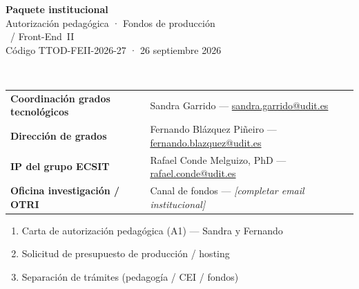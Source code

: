 \documentclass[11pt,a4paper]{scrartcl}
\begin{document}
\LogoRow
\begin{center}
  {\LARGE\sffamily\bfseries Paquete institucional}\\[0.35em]
  {\large\sffamily Autorización pedagógica · Fondos de producción}\\[0.5em]
  {\normalsize\color{uditnavy} \TTODfull\ / Front-End~II}\\[0.35em]
  {\small Código TTOD-FEII-2026-27 · 26 septiembre 2026}
\end{center}

\vspace{0.5em}
\\[0.25em]
\noindent
\begin{tabularx}{\textwidth}{@{}>{\raggedright\arraybackslash}p{4.6cm}X@{}}
  \textbf{Coordinación grados tecnológicos} &
    Sandra Garrido ---
    \href{mailto:sandra.garrido@udit.es}{sandra.garrido@udit.es}\\[0.15em]
  \textbf{Dirección de grados} &
    Fernando Blázquez Piñeiro ---
    \href{mailto:fernando.blazquez@udit.es}{fernando.blazquez@udit.es}\\[0.15em]
  \textbf{IP del grupo ECSIT} &
    Rafael Conde Melguizo, PhD ---
    \href{mailto:rafael.conde@udit.es}{rafael.conde@udit.es}\\[0.15em]
  \textbf{Oficina investigación / OTRI} &
    Canal de fondos --- \emph{[completar email institucional]}
\end{tabularx}

\vspace{0.45em}

\vspace{0.4em}
\begin{enumerate}
  \item Carta de autorización pedagógica (A1) --- Sandra y Fernando
  \item Solicitud de presupuesto de producción / hosting
  \item Separación de trámites (pedagogía / CEI / fondos)
\end{enumerate}

\vspace{0.35em}
\LegalEntities
\end{document}
